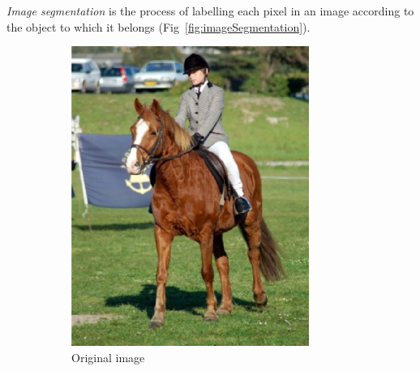 \emph{Image segmentation} is the process of labelling each pixel in an image according to the object to which it belongs (Fig~\ref{fig:imageSegmentation}).

\begin{figure}[h]
	\centering
	\begin{subfigure}{0.27\textwidth}
                \includegraphics[width=\textwidth]{plots/segmentationImage.png}
		\caption{Original image}
        \end{subfigure}
	~
	\begin{subfigure}{0.27\textwidth}

\end{subfigure}
\end{figure}
